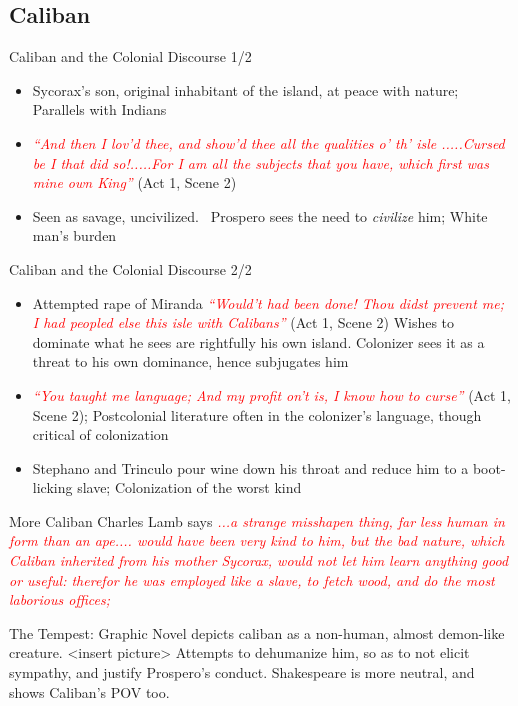 \documentclass{beamer}
\begin{document}
\subsection{Caliban}
  \begin{frame}{Caliban and the Colonial Discourse 1/2}
    \begin{itemize}
    \item Sycorax's son, original inhabitant of the island, at peace with nature; Parallels with Indians
    \item \textcolor{red}{\emph{``And then I lov'd thee, and show'd thee all the qualities o' th' isle .....Cursed be I that did so!.....For I am all the subjects that you have, which first was mine own King''}} (Act 1, Scene 2)
    \item Seen as savage, uncivilized.~\cite{1989} Prospero sees the need to \emph{civilize} him; White man's burden
    \end{itemize}
  \end{frame}
  \begin{frame}{Caliban and the Colonial Discourse 2/2}
    \begin{itemize}
    \item Attempted rape of Miranda \textcolor{red}{\emph{``Would't had been done! Thou didst prevent me; I had peopled else this isle with Calibans''}} (Act 1, Scene 2) Wishes to dominate what he sees are rightfully his own island. Colonizer sees it as a threat to his own dominance, hence subjugates him
    \item \textcolor{red}{\emph{``You taught me language; And my profit on't is, I know how to curse''}} (Act 1, Scene 2); Postcolonial literature often in the colonizer's language, though critical of colonization
    \item Stephano and Trinculo pour wine down his throat and reduce him to a boot-licking slave; Colonization of the worst kind
    \end{itemize}
  \end{frame}

  \begin{frame}{More Caliban}
      Charles Lamb says \textcolor{red}{\emph{...a strange misshapen thing, far less human in form than an ape.... would have been very kind to him, but the bad nature, which Caliban inherited from his mother Sycorax, would not let him learn anything good or useful: therefor he was employed like a slave, to fetch wood, and do the most laborious offices;}}

        The Tempest: Graphic Novel depicts caliban as a non-human, almost demon-like creature. 
        <insert picture>
        Attempts to dehumanize him, so as to not elicit sympathy, and justify Prospero's conduct. Shakespeare is more neutral, and shows Caliban's POV too.
  \end{frame}
\end{document}
